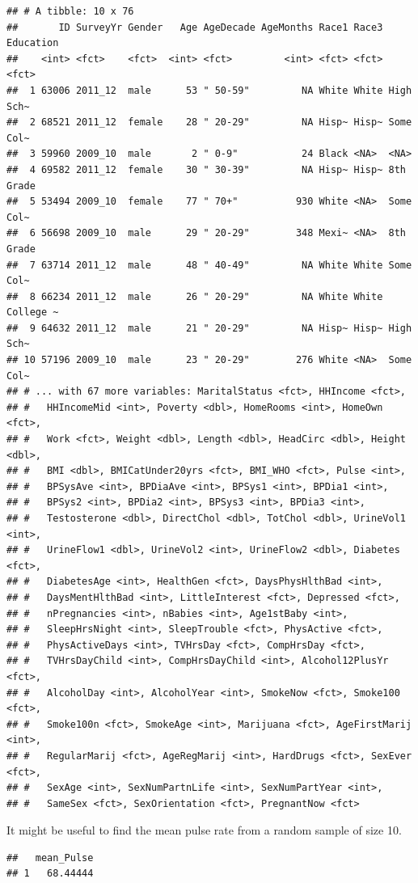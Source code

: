 \documentclass[]{book}
\begin{document}
\begin{verbatim}
## # A tibble: 10 x 76
##       ID SurveyYr Gender   Age AgeDecade AgeMonths Race1 Race3 Education
##    <int> <fct>    <fct>  <int> <fct>         <int> <fct> <fct> <fct>    
##  1 63006 2011_12  male      53 " 50-59"         NA White White High Sch~
##  2 68521 2011_12  female    28 " 20-29"         NA Hisp~ Hisp~ Some Col~
##  3 59960 2009_10  male       2 " 0-9"           24 Black <NA>  <NA>     
##  4 69582 2011_12  female    30 " 30-39"         NA Hisp~ Hisp~ 8th Grade
##  5 53494 2009_10  female    77 " 70+"          930 White <NA>  Some Col~
##  6 56698 2009_10  male      29 " 20-29"        348 Mexi~ <NA>  8th Grade
##  7 63714 2011_12  male      48 " 40-49"         NA White White Some Col~
##  8 66234 2011_12  male      26 " 20-29"         NA White White College ~
##  9 64632 2011_12  male      21 " 20-29"         NA Hisp~ Hisp~ High Sch~
## 10 57196 2009_10  male      23 " 20-29"        276 White <NA>  Some Col~
## # ... with 67 more variables: MaritalStatus <fct>, HHIncome <fct>,
## #   HHIncomeMid <int>, Poverty <dbl>, HomeRooms <int>, HomeOwn <fct>,
## #   Work <fct>, Weight <dbl>, Length <dbl>, HeadCirc <dbl>, Height <dbl>,
## #   BMI <dbl>, BMICatUnder20yrs <fct>, BMI_WHO <fct>, Pulse <int>,
## #   BPSysAve <int>, BPDiaAve <int>, BPSys1 <int>, BPDia1 <int>,
## #   BPSys2 <int>, BPDia2 <int>, BPSys3 <int>, BPDia3 <int>,
## #   Testosterone <dbl>, DirectChol <dbl>, TotChol <dbl>, UrineVol1 <int>,
## #   UrineFlow1 <dbl>, UrineVol2 <int>, UrineFlow2 <dbl>, Diabetes <fct>,
## #   DiabetesAge <int>, HealthGen <fct>, DaysPhysHlthBad <int>,
## #   DaysMentHlthBad <int>, LittleInterest <fct>, Depressed <fct>,
## #   nPregnancies <int>, nBabies <int>, Age1stBaby <int>,
## #   SleepHrsNight <int>, SleepTrouble <fct>, PhysActive <fct>,
## #   PhysActiveDays <int>, TVHrsDay <fct>, CompHrsDay <fct>,
## #   TVHrsDayChild <int>, CompHrsDayChild <int>, Alcohol12PlusYr <fct>,
## #   AlcoholDay <int>, AlcoholYear <int>, SmokeNow <fct>, Smoke100 <fct>,
## #   Smoke100n <fct>, SmokeAge <int>, Marijuana <fct>, AgeFirstMarij <int>,
## #   RegularMarij <fct>, AgeRegMarij <int>, HardDrugs <fct>, SexEver <fct>,
## #   SexAge <int>, SexNumPartnLife <int>, SexNumPartYear <int>,
## #   SameSex <fct>, SexOrientation <fct>, PregnantNow <fct>
\end{verbatim}

It might be useful to find the mean pulse rate from a random sample of size 10.

\begin{verbatim}
##   mean_Pulse
## 1   68.44444
\end{verbatim}
\end{document}
